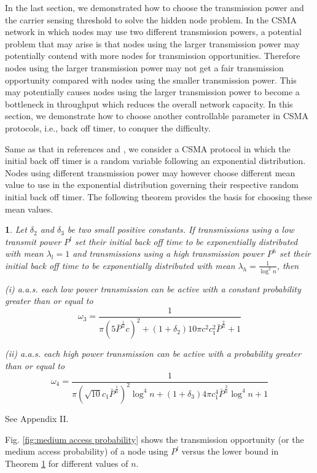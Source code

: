 \documentclass[english]{IEEEtran}
\theoremstyle{plain}
\newtheorem{thm}{\protect\theoremname}
\theoremstyle{plain}
\theoremstyle{plain}
\theoremstyle{remark}
\providecommand{\theoremname}{Theorem}
\begin{document}
In the last section, we demonstrated how to choose the transmission
power and the carrier sensing threshold to solve the hidden node problem.
In the CSMA network in which nodes may use two different transmission
powers, a potential problem that may arise is that nodes using the
larger transmission power may potentially contend with more nodes
for transmission opportunities. Therefore nodes using the larger transmission
power may not get a fair transmission opportunity compared with nodes
using the smaller transmission power. This may potentially causes
nodes using the larger transmission power to become a bottleneck in
throughput which reduces the overall network capacity. In this section,
we demonstrate how to choose another controllable parameter in CSMA
protocols, i.e., back off timer, to conquer the difficulty.

Same as that in references \cite{Chau11Capacity} and \cite{Jiang10A},
we consider a CSMA protocol in which the initial back off timer is
a random variable following an exponential distribution. Nodes using
different transmission power may however choose different mean value
to use in the exponential distribution governing their respective
random initial back off timer. The following theorem provides the
basis for choosing these mean values.


\begin{thm}
\label{thm:medium access probability}Let $\delta_{2}$ and $\delta_{3}$
be two small positive constants. If transmissions using a low transmit
power $P^{l}$ set their initial back off time to be exponentially
distributed with mean $\lambda_{l}=1$ and transmissions using a high
transmission power $P^{h}$ set their initial back off time to be
exponentially distributed with mean $\lambda_{h}=\frac{1}{\log^{2}n}$,
then 

(i) a.a.s. each low power transmission can be active with a constant
probability greater than or equal to 
\begin{equation}
\omega_{3}=\frac{1}{\pi\left(5\bar{P}^{\frac{1}{\alpha}}c\right)^{2}+\left(1+\delta_{2}\right)10\pi c^{2}c_{1}^{2}\bar{P}^{\frac{2}{\alpha}}+1}\label{eq:omega_3}
\end{equation}


(ii) a.a.s. each high power transmission can be active with a probability
greater than or equal to 
\[
\omega_{4}=\frac{1}{\pi\left(\sqrt{10}c_{1}\bar{P}^{\frac{1}{\alpha}}\right)^{2}\log^{4}n+\left(1+\delta_{3}\right)4\pi c_{1}^{4}\bar{P}^{\frac{2}{\alpha}}\log^{4}n+1}
\]
\end{thm}
\begin{IEEEproof}
See Appendix II.
\end{IEEEproof}
Fig. \ref{fig:medium access probability} shows the transmission opportunity
(or the medium access probability) of a node using $P^{l}$ versus
the lower bound in Theorem \ref{thm:medium access probability} for
different values of $n$.
\end{document}
